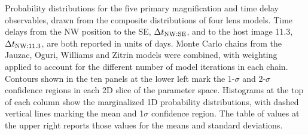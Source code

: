 Probability distributions for the five primary magnification and time
delay observables, drawn from the composite distributions of four lens
models.  Time delays from the NW position to the SE,
$\Delta t_{\rm NW:SE}$, and to the host image 11.3, $\Delta t_{\rm NW:11.3}$, 
are both reported in units of days. Monte Carlo chains from the
Jauzac, Oguri, Williams and Zitrin models were combined, with
weighting applied to account for the different number of model
iterations in each chain.  Contours shown in the ten panels at the
lower left mark the 1-$\sigma$ and 2-$\sigma$ confidence regions in
each 2D slice of the parameter space. Histograms at the top of each
column show the marginalized 1D probability distributions, with dashed
vertical lines marking the mean and 1$\sigma$ confidence region.  The
table of values at the upper right reports those values for the means
and standard deviations.
\label{fig:LensModelContours}

